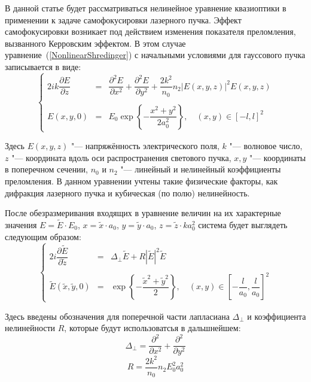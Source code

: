 В данной статье будет рассматриваться нелинейное уравнение квазиоптики в применении к задаче самофокусировки лазерного пучка.
Эффект самофокусировки возникает под действием изменения показателя преломления, вызванного Керровским эффектом.
В этом случае уравнение~(\ref{NonlinearShredinger}) с начальными условиями для гауссового пучка записывается в виде:
\begin{equation}\label{MainDim}
    \left\{
    \begin{array}{rcl}
        2ik\dfrac{\partial E}{\partial z} & = & \dfrac{\partial^2 E}{\partial x^2} + \dfrac{\partial^2 E}{\partial y^2} +
        \dfrac{2k^2}{n_0}n_2\left|E\left(x,y,z\right)\right|^2E\left(x,y,z\right)\\
        \\
        E(x,y,0) & = & E_0\exp\left\{-\dfrac{x^2+y^2}{2a_0^2}\right\},\quad (x,y)\in[-l,l]^2
    \end{array}
    \right.
\end{equation}

Здесь $E\left(x,y,z\right)$ "--- напряжённость электрического поля, $k$ "--- волновое число, $z$ "--- координата вдоль оси распространения светового пучка,
$x,y$ "--- координаты в поперечном сечении, $n_0$ и $n_2$ "--- линейный и нелинейный коэффициенты преломления.
В данном уравнении учтены такие физические факторы, как дифракция лазерного пучка и кубическая (по полю) нелинейность.

После обезразмеривания входящих в уравнение величин на их характерные значения $E=\tilde{E}\cdot E_0$, $x=\tilde{x}\cdot a_0$, $y=\tilde{y}\cdot a_0$, $z=\tilde{z}\cdot ka_0^2$ система будет выглядеть следующим образом:
\begin{equation}\label{MainNoDim}
    \left\{
    \begin{array}{rcl}
        2i\dfrac{\partial \tilde{E}}{\partial \tilde{z}} & = & \Delta_{\perp}\tilde{E} + R\left|\tilde{E}\right|^2\tilde{E}\\
        \\
        \tilde{E}(\tilde{x},\tilde{y},0) & = & \exp\left\{-\dfrac{\tilde{x}^2+\tilde{y}^2}{2}\right\}, \quad (x,y)\in\left[-\dfrac{l}{a_0},\dfrac{l}{a_0}\right]^2
    \end{array}
    \right.
\end{equation}


Здесь введены обозначения для поперечной части лапласиана $\Delta_{\perp}$ и коэффициента нелинейности $R$, которые будут использоватсья в дальшнейшем:
\begin{equation}
    \Delta_{\perp} = \dfrac{\partial^2}{\partial x^2} + \dfrac{\partial^2}{\partial y^2}
\end{equation}
\begin{equation}
    R = \dfrac{2k^2}{n_0} n_2 E_0^2 a_0^2
\end{equation}


